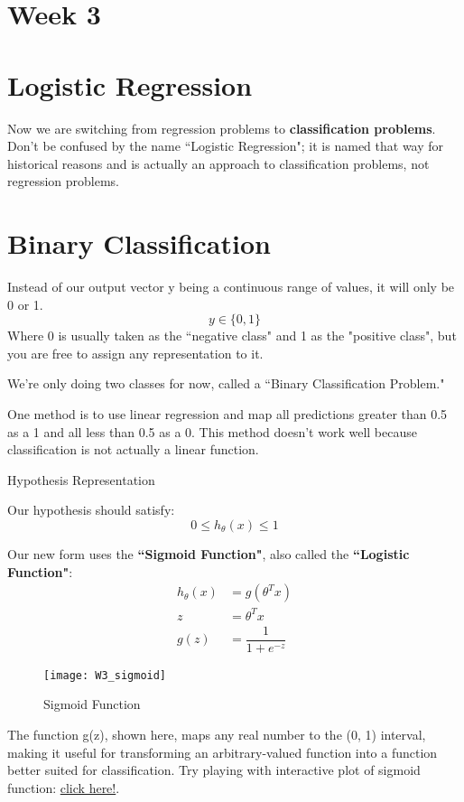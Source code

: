 \newpage
\section{Week 3}
\section*{Logistic Regression}
Now we are switching from regression problems to {\bf classification problems}. Don't be confused by the name ``Logistic Regression"; it is named that way for historical reasons and is actually an approach to classification problems, not regression problems.
\section*{Binary Classification}
Instead of our output vector y being a continuous range of values, it will only be 0 or 1.
\[y \in \{0,1\} \]
Where 0 is usually taken as the ``negative class" and 1 as the "positive class", but you are free to assign any representation to it.

We're only doing two classes for now, called a ``Binary Classification Problem."

One method is to use linear regression and map all predictions greater than 0.5 as a 1 and all less than 0.5 as a 0. This method doesn't work well because classification is not actually a linear function.

Hypothesis Representation

Our hypothesis should satisfy:
\[0 \leq h_\theta (x) \leq 1 \]

Our new form uses the {\bf ``Sigmoid Function"}, also called the {\bf ``Logistic Function"}:
\begin{align}
h_\theta (x) &=  g ( \theta^T x ) \\
z &= \theta^T x \\
g(z) &= \dfrac{1}{1 + e^{-z}}
\end{align}

\begin{figure}[ht]
\center
\texttt{[image: W3\_sigmoid]}
\caption{Sigmoid Function}
\label{fig:W3_sigmoid}
\end{figure}

The function g(z), shown here, maps any real number to the (0, 1) interval, making it useful for transforming an arbitrary-valued function into a function better suited for classification. Try playing with interactive plot of sigmoid function: \href{https://www.desmos.com/calculator/bgontvxotm}{click here!}.

